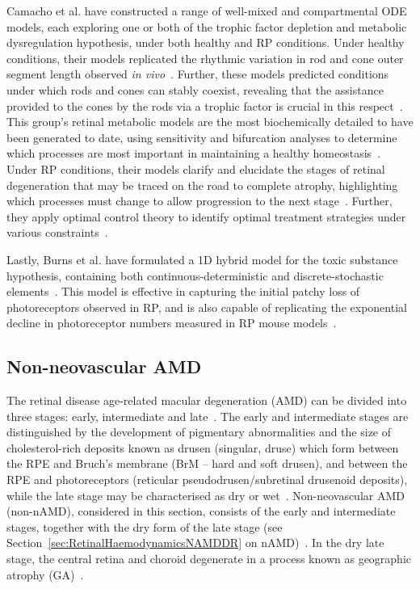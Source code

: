 \documentclass{article}
\begin{document}
%
Camacho et al. have constructed a range of well-mixed and compartmental ODE models, each exploring one or both of the trophic factor depletion and metabolic dysregulation hypothesis, under both healthy and RP conditions. Under healthy conditions, their models replicated the rhythmic variation in rod and cone outer segment length observed \emph{in vivo}~\cite{Camacho_et_al_2010,Camacho_et_al_2016b,Colon_Velez_et_al_2003, Wifvat_et_al_2021}. Further, these models predicted conditions under which rods and cones can stably coexist, revealing that the assistance provided to the cones by the rods via a trophic factor is crucial in this respect~\cite{Camacho_et_al_2010,Camacho_et_al_2016b,Colon_Velez_et_al_2003, Wifvat_et_al_2021}. This group’s retinal metabolic models are the most biochemically detailed to have been generated to date, using sensitivity and bifurcation analyses to determine which processes are most important in maintaining a healthy homeostasis~\cite{Aparicio_et_al_2022,Dobreva_et_al_2022,Camacho_et_al_2019,Camacho_et_al_2021a}. Under RP conditions, their models clarify and elucidate the stages of retinal degeneration that may be traced on the road to complete atrophy, highlighting which processes must change to allow progression to the next stage~\cite{Camacho_and_Wirkus_2013,Camacho_et_al_2016,Camacho_et_al_2016c}. Further, they apply optimal control theory to identify optimal treatment strategies under various constraints~\cite{Camacho_et_al_2014,Camacho_et_al_2020}.

Lastly, Burns et al. have formulated a 1D hybrid model for the toxic substance hypothesis, containing both continuous-deterministic and discrete-stochastic elements~\cite{Burns_et_al_2002}. This model is effective in capturing the initial patchy loss of photoreceptors observed in RP, and is also capable of replicating the exponential decline in photoreceptor numbers measured in RP mouse models~\cite{Clarke_et_al_2000}.
%
\subsection{Non-neovascular AMD}\label{Sec_non-nAMD}
%
The retinal disease age-related macular degeneration (AMD) can be divided into three stages: early, intermediate and late~\cite{Ferris_et_al_2013}. The early and intermediate stages are distinguished by the development of pigmentary abnormalities and the size of cholesterol-rich deposits known as drusen (singular, druse) which form between the RPE and Bruch’s membrane (BrM – hard and soft drusen), and between the RPE and photoreceptors (reticular pseudodrusen/subretinal drusenoid deposits), while the late stage may be characterised as dry or wet~\cite{Coleman_et_al_2008,Ferris_et_al_2013,Jager_2008,Wu_et_al_2022}. Non-neovascular AMD (non-nAMD), considered in this section, consists of the early and intermediate stages, together with the dry form of the late stage (see Section~\ref{sec:RetinalHaemodynamicsNAMDDR} on nAMD)~\cite{Ferris_et_al_2013}. In the dry late stage, the central retina and choroid degenerate in a process known as geographic atrophy (GA)~\cite{Coleman_et_al_2008,Jager_2008,Ly_et_al_2016}.
\end{document}
